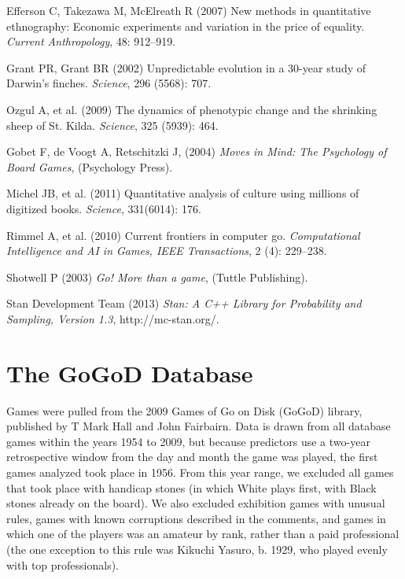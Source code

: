 \documentclass{article}
\begin{document}
\begin{thebibliography}{10}
Efferson C, Takezawa M, McElreath R (2007) New methods in quantitative ethnography: Economic experiments and variation in the price of equality. \emph{Current Anthropology}, 48: 912--919.

Grant PR, Grant BR (2002) Unpredictable evolution in a 30-year study of Darwin's finches. \emph{Science}, 296 (5568): 707.

Ozgul A, et al. (2009) The dynamics of phenotypic change and the shrinking sheep of St. Kilda. \emph{Science}, 325 (5939): 464.

Gobet F, de Voogt A, Retschitzki J, (2004) \emph{Moves in Mind: The Psychology of Board Games}, (Psychology Press).

Michel JB, et al. (2011) Quantitative analysis of culture using millions of digitized books. \emph{Science}, 331(6014): 176.

Rimmel A, et al. (2010) Current frontiers in computer go. \emph{Computational Intelligence and AI in Games, IEEE Transactions}, 2 (4): 229--238.

Shotwell P (2003) \emph{Go! More than a game}, (Tuttle Publishing).

Stan Development Team (2013) \emph{Stan: A C++ Library for Probability and Sampling, Version 1.3}, http://mc-stan.org/.

\end{thebibliography}


\appendix

\section{The GoGoD Database}

Games were pulled from the 2009 Games of Go on Disk (GoGoD) library, published by T Mark Hall and John Fairbairn.  Data is drawn from all database games within the years 1954 to 2009, but because predictors use a two-year retrospective window from the day and month the game was played, the first games analyzed took place in 1956.  From this year range, we excluded all games that took place with handicap stones (in which White plays first, with Black stones already on the board).  We also excluded exhibition games with unusual rules, games with known corruptions described in the comments, and games in which one of the players was an amateur by rank, rather than a paid professional (the one exception to this rule was Kikuchi Yasuro, b. 1929, who played evenly with top professionals).    
\end{document}
